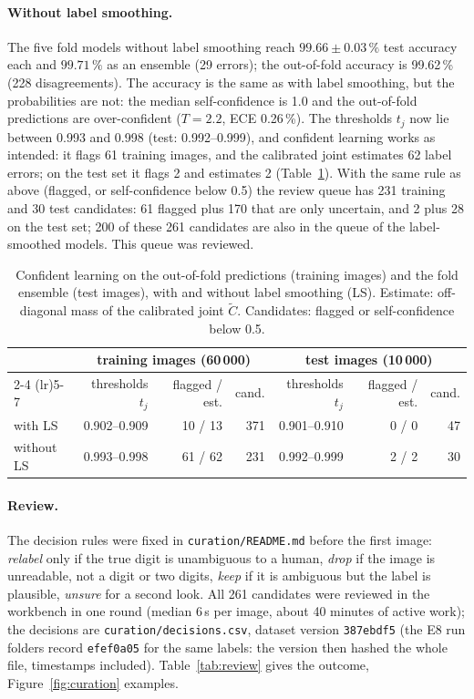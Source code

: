 \documentclass[11pt,a4paper]{article}
\newcommand{\1}{\mathbf{1}}
\begin{document}
\paragraph{Without label smoothing.} The five fold models without label smoothing reach
$99.66 \pm 0.03\,\%$ test accuracy each and $99.71\,\%$ as an ensemble (29 errors); the
out-of-fold accuracy is 99.62\,\% (228 disagreements). The accuracy is the same as with label
smoothing, but the probabilities are not: the median self-confidence is 1.0 and the
out-of-fold predictions are over-confident ($T = 2.2$, ECE 0.26\,\%). The thresholds $t_j$ now
lie between 0.993 and 0.998 (test: 0.992--0.999), and confident learning works as intended:
it flags 61 training images, and the calibrated joint estimates 62 label errors; on the test
set it flags 2 and estimates 2 (Table~\ref{tab:cl}). With the same rule as above (flagged, or
self-confidence below 0.5) the review queue has 231 training and 30 test candidates: 61 flagged
plus 170 that are only uncertain, and 2 plus 28 on the test set; 200 of these 261 candidates
are also in the queue of the label-smoothed models. This queue was reviewed.

\begin{table}[t]
  \centering
  \small
  \caption{Confident learning on the out-of-fold predictions (training images) and the fold
    ensemble (test images), with and without label smoothing (LS). Estimate: off-diagonal mass
    of the calibrated joint $\tilde C$. Candidates: flagged or self-confidence below 0.5.}
  \label{tab:cl}
  \begin{tabular}{lrrrrrr}
    \toprule
    & \multicolumn{3}{c}{training images (60\,000)} & \multicolumn{3}{c}{test images (10\,000)} \\
    \cmidrule(lr){2-4} \cmidrule(lr){5-7}
    & thresholds $t_j$ & flagged / est. & cand. & thresholds $t_j$ & flagged / est. & cand. \\
    \midrule
    with LS & 0.902--0.909 & 10 / 13 & 371 & 0.901--0.910 & 0 / 0 & 47 \\
    without LS & 0.993--0.998 & 61 / 62 & 231 & 0.992--0.999 & 2 / 2 & 30 \\
    \bottomrule
  \end{tabular}
\end{table}

\paragraph{Review.} The decision rules were fixed in \texttt{curation/README.md} before the
first image: \emph{relabel} only if the true digit is unambiguous to a human, \emph{drop} if the
image is unreadable, not a digit or two digits, \emph{keep} if it is ambiguous but the label is
plausible, \emph{unsure} for a second look. All 261 candidates were reviewed in the workbench
in one round (median 6\,s per image, about 40 minutes of active work); the decisions are
\texttt{curation/decisions.csv}, dataset version \texttt{387ebdf5} (the E8 run folders record \texttt{efef0a05} for the same labels: the version then hashed the whole file, timestamps included). Table~\ref{tab:review}
gives the outcome, Figure~\ref{fig:curation} examples.
\end{document}
